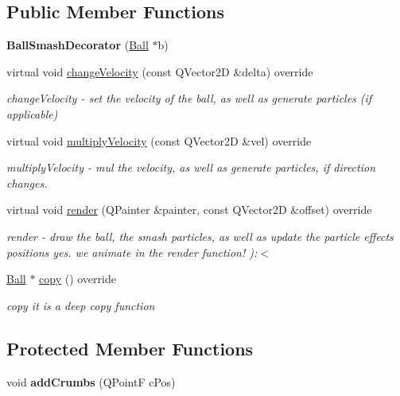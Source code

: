 \subsection*{Public Member Functions}
\begin{DoxyCompactItemize}
\item 
\mbox{\label{class_ball_smash_decorator_a9820f584d49fa51ccf288b6bb4700744}} 
{\bfseries Ball\+Smash\+Decorator} (\mbox{\hyperlink{class_ball}{Ball}} $\ast$b)
\item 
virtual void \mbox{\hyperlink{class_ball_smash_decorator_ad59848156e8eabad3e561a1d113f7029}{change\+Velocity}} (const Q\+Vector2D \&delta) override
\begin{DoxyCompactList}\small\item\em change\+Velocity -\/ set the velocity of the ball, as well as generate particles (if applicable) \end{DoxyCompactList}\item 
virtual void \mbox{\hyperlink{class_ball_smash_decorator_a017998926f2b3ebdfcf49e074ea86aae}{multiply\+Velocity}} (const Q\+Vector2D \&vel) override
\begin{DoxyCompactList}\small\item\em multiply\+Velocity -\/ mul the velocity, as well as generate particles, if direction changes. \end{DoxyCompactList}\item 
virtual void \mbox{\hyperlink{class_ball_smash_decorator_a8cbf47d481100f16f2376670fee9fdcc}{render}} (Q\+Painter \&painter, const Q\+Vector2D \&offset) override
\begin{DoxyCompactList}\small\item\em render -\/ draw the ball, the smash particles, as well as update the particle effects positions yes. we animate in the render function! )\+:$<$ \end{DoxyCompactList}\item 
\mbox{\hyperlink{class_ball}{Ball}} $\ast$ \mbox{\hyperlink{class_ball_smash_decorator_ab5efc4c2f676224223940a7a4f7dcd77}{copy}} () override
\begin{DoxyCompactList}\small\item\em copy it is a deep copy function \end{DoxyCompactList}\end{DoxyCompactItemize}
\subsection*{Protected Member Functions}
\begin{DoxyCompactItemize}
\item 
\mbox{\label{class_ball_smash_decorator_aa800f137e36d43bdfa86843091905186}} 
void {\bfseries add\+Crumbs} (Q\+PointF c\+Pos)
\end{DoxyCompactItemize}
